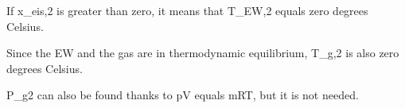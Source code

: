 If x_eis,2 is greater than zero, it means that T_EW,2 equals zero degrees Celsius.

Since the EW and the gas are in thermodynamic equilibrium, T_g,2 is also zero degrees Celsius.

P_g2 can also be found thanks to pV equals mRT, but it is not needed.